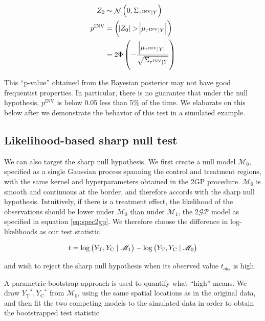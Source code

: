 \documentclass[letter]{article}
\let\Pr\relax
\DeclareMathOperator{\Pr}{\mathbb{P}}
\DeclareMathOperator{\normal}{\mathcal{N}}
\newcommand{\gp}{\mathcal{GP}}
\newcommand{\treat}{\mathrm{T}}
\newcommand{\ctrol}{\mathrm{C}}
\newcommand{\invvar}{\tau^{\mathrm{INV}}}
\newcommand{\modnull}{\mathscr{M}_0}
\newcommand{\modalt}{\mathscr{M}_1}
\begin{document}
\begin{equation}
\begin{split}
    Z_0 &\sim \normal\del{0, \Sigma_{\invvar \mid Y}}  \\
    p^{\mathrm{INV}} &= \Pr\del{ 
        \abs{Z_0} > 
        \abs{
            \mu_{
                \invvar \mid Y
            }
        } 
    } \\
    &= 2\Phi\del{-
        \frac{
            \abs{
                \mu_{
                    \invvar \mid Y
                }
            }
        }{
            \sqrt{
                \Sigma_{\invvar \mid Y}
            }
        }
    }
\end{split}
\end{equation}

This ``p-value'' obtained from the Bayesian posterior may not have good frequentist properties. In particular, there is no guarantee that under the null hypothesis, \(p^{\mathrm{INV}}\) is below 0.05 less than 5\% of the time. We elaborate on this below after we demonstrate the behavior of this test in a simulated example.
    


    	\subsection{Likelihood-based sharp null test}\label{likelihood-based-sharp-null-test}

We can also target the sharp null hypothesis.
We first create a null model \(\modnull\),
specified as a single Gaussian process spanning the control and treatment regions,
with the same kernel and hyperparameters obtained in the 2GP procedure.
\(\modnull\) is smooth and continuous at the border,
and therefore accords with the sharp null hypothesis.
Intuitively, if there is a treatment effect,
the likelihood of the observations should be lower under \(\modnull\) than under \(\modalt\),
the 2\(\gp\) model as specified in equation \eqref{eq:spec2gp}.
We therefore choose the difference in log-likelihoods as our test statistic

\begin{equation}
    t = \log \Pr\del{Y_\treat{}, Y_\ctrol{} \mid \modalt} - \log \Pr\del{Y_\treat{}, Y_\ctrol{} \mid \modnull}
\end{equation}

and wish to reject the sharp null hypothesis when its observed value \(t_{obs}\) is high.

A parametric bootstrap approach is used to quantify what ``high'' means. We draw \(Y_\treat{}^*,Y_\ctrol{}^*\) from \(\modnull\),
using the same spatial locations as in the original data,
and then fit the two competing models to the simulated data in order to obtain the bootstrapped test statistic
\end{document}
